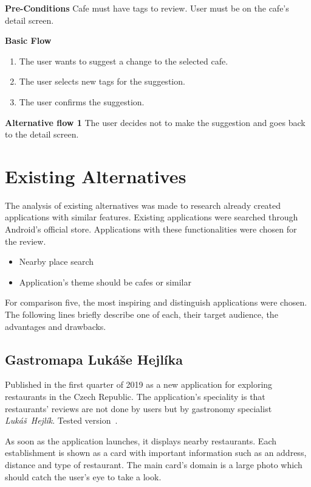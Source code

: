 \textbf{Pre-Conditions} Cafe must have tags to review.  User must be on the cafe's detail screen.

\newpara
\textbf{Basic Flow}

\begin{enumerate}
    \item The user wants to suggest a change to the selected cafe.
    \item The user selects new tags for the suggestion. 
    \item The user confirms the suggestion.
\end{enumerate}

\textbf{Alternative flow 1} The user decides not to make the suggestion and goes back to the detail screen.


\section{Existing Alternatives}
The analysis of existing alternatives was made to research already created applications with similar features. Existing applications were searched through Android's official store. Applications with these functionalities were chosen for the review.

\begin{itemize}
    \item Nearby place search
    \item Application's theme should be cafes or similar
\end{itemize}

For comparison five, the most inspiring and distinguish applications were chosen. The following lines briefly describe one of each, their target audience, the advantages and drawbacks. 

\subsection{Gastromapa Lukáše Hejlíka}
Published in the first quarter of 2019 as a new application for exploring restaurants in the Czech Republic.  The application's speciality is that restaurants' reviews are not done by users but by gastronomy specialist \textit{Lukáš~Hejlík}. Tested version~\cite{app-hejlik}.

As soon as the application launches, it displays nearby restaurants. Each establishment is shown as a card with important information such as an address, distance and type of restaurant. The main card's domain is a large photo which should catch the user's eye to take a look. 

